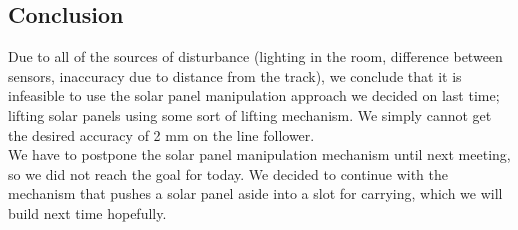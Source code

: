 \subsection{Conclusion}

Due to all of the sources of disturbance (lighting in the room,
difference between sensors, inaccuracy due to distance from the track),
we conclude that it is infeasible to use the solar panel manipulation
approach we decided on last time; lifting solar panels using some sort
of lifting mechanism. We simply cannot get the desired accuracy of 2 mm
on the line follower.\\We have to postpone the solar panel manipulation
mechanism until next meeting, so we did not reach the goal for today. We
decided to continue with the mechanism that pushes a solar panel aside
into a slot for carrying, which we will build next time hopefully.
